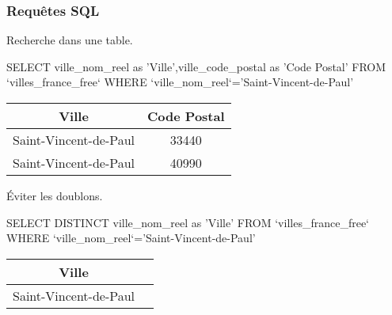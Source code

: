 \begin{frame}[fragile]
\frametitle{Requêtes SQL}

Recherche dans une table.

\begin{GrayBox}[0.85\textwidth]
\begin{semiverbatim}\small
SELECT ville_nom_reel as 'Ville',ville_code_postal as 'Code Postal'
FROM `villes_france_free`
WHERE `ville_nom_reel`='Saint-Vincent-de-Paul'
\end{semiverbatim}
\end{GrayBox}

\begin{center}
\begin{tabular}{|c|c|}
\hline
\textbf{Ville} & \textbf{Code Postal} \\
\hline
Saint-Vincent-de-Paul & 33440 \\
\hline
Saint-Vincent-de-Paul & 40990 \\
\hline
\end{tabular}
\end{center}

Éviter les doublons.

\begin{minipage}{0.7\linewidth}
\begin{GrayBox}[0.85\textwidth]
\begin{semiverbatim}\small
SELECT DISTINCT ville_nom_reel as 'Ville'
FROM `villes_france_free`
WHERE `ville_nom_reel`='Saint-Vincent-de-Paul'
\end{semiverbatim}
\end{GrayBox}
\end{minipage}\hfill
\begin{minipage}{0.25\linewidth}
\begin{center}
\begin{tabular}{|c|c|}
\hline
\textbf{Ville} \\
\hline
Saint-Vincent-de-Paul \\
\hline
\end{tabular}
\end{center}
\end{minipage}
\end{frame}

